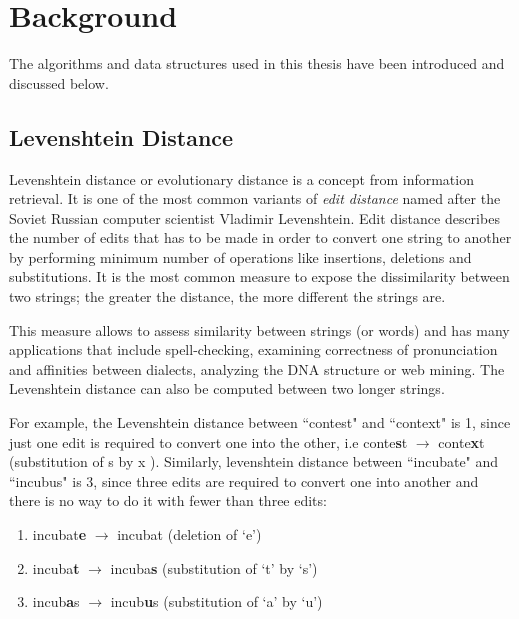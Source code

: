 \chapter{Background}
	The algorithms and data structures used in this thesis have been introduced and discussed below.

	\section{Levenshtein Distance}
	\label{sec:levenshtein_distance}
		Levenshtein distance \cite{levenshtein1966binary} or evolutionary distance is a concept from information retrieval. It is one of the most common variants of \emph{edit distance} named after the Soviet Russian computer scientist Vladimir Levenshtein. Edit distance \cite {wagner1974string} describes the number of edits that has to be made in order to convert one string to another by performing minimum number of operations like insertions, deletions and substitutions. It is the most common measure to expose the dissimilarity between two strings; the greater the distance, the more different the strings are.
		
		This measure allows to assess similarity between strings (or words) and has many applications that include spell-checking, examining correctness of pronunciation and affinities between dialects, analyzing the DNA structure or web mining. The Levenshtein distance can also be computed between two longer strings.
		
		For example, the Levenshtein distance between ``contest" and ``context" is 1, since just one edit is required to convert one into the other, i.e conte{\bf s}t $\rightarrow$ conte{\bf x}t (substitution of s by x ). Similarly, levenshtein distance between ``incubate" and ``incubus" is 3, since three edits are required to convert one into another and there is no way to do it with fewer than three edits:
		
		\begin{enumerate}
			\item incubat{\bf e} $\rightarrow$ incubat (deletion of ‘e’)
			\item incuba{\bf t} $\rightarrow$ incuba{\bf s} (substitution of ‘t’ by ‘s’)
			\item incub{\bf a}s $\rightarrow$ incub{\bf u}s (substitution of ‘a’ by ‘u’)
		\end{enumerate}
		
